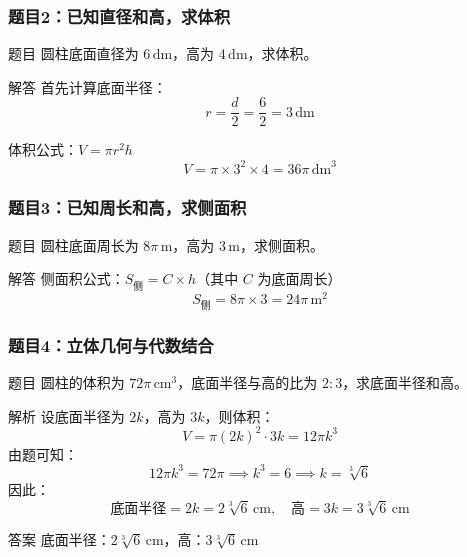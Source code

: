 \begin{frame}
    \frametitle{题目2：已知直径和高，求体积}
    \begin{block}{题目}
        圆柱底面直径为 \(6 \, \text{dm}\)，高为 \(4 \, \text{dm}\)，求体积。
    \end{block}
    
    \vspace{0.5cm}
    \pause
    \begin{block}{解答}
        首先计算底面半径：
        \[
        r = \frac{d}{2} = \frac{6}{2} = 3 \, \text{dm}
        \]
        
        体积公式：\( V = \pi r^2 h \)
        \[
        V = \pi \times 3^2 \times 4 = 36\pi \, \text{dm}^3
        \]
    \end{block}
\end{frame}

\begin{frame}
    \frametitle{题目3：已知周长和高，求侧面积}
    \begin{block}{题目}
        圆柱底面周长为 \(8\pi \, \text{m}\)，高为 \(3 \, \text{m}\)，求侧面积。
    \end{block}
    
    \vspace{0.5cm}
    \pause
    
    \begin{block}{解答}
        侧面积公式：\( S_{\text{侧}} = C \times h \)（其中 \(C\) 为底面周长）
        \[
        S_{\text{侧}} = 8\pi \times 3 = 24\pi \, \text{m}^2
        \]
    \end{block}
\end{frame}


\begin{frame}
    \frametitle{题目4：立体几何与代数结合}
    \begin{block}{题目}
        圆柱的体积为 \(72\pi \, \text{cm}^3\)，底面半径与高的比为 \(2:3\)，求底面半径和高。
    \end{block}
    \pause
    
    \begin{block}{解析}
        设底面半径为 \(2k\)，高为 \(3k\)，则体积：
        \[
        V = \pi (2k)^2 \cdot 3k = 12\pi k^3
        \]
        由题可知：
        \[
        12\pi k^3 = 72\pi \implies k^3 = 6 \implies k = \sqrt[3]{6}
        \]
        因此：
        \[
        \text{底面半径} = 2k = 2\sqrt[3]{6} \, \text{cm}, \quad \text{高} = 3k = 3\sqrt[3]{6} \, \text{cm}
        \]
    \end{block}
    
    \begin{alertblock}{答案}
        底面半径：\(2\sqrt[3]{6} \, \text{cm}\)，高：\(3\sqrt[3]{6} \, \text{cm}\)
    \end{alertblock}
\end{frame}



